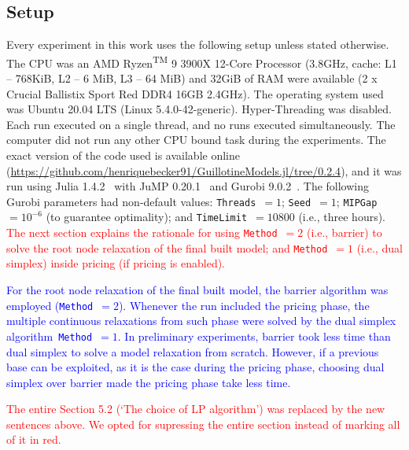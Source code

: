 \documentclass[smallextended]{svjour3}       %
\newif\iffinalversion
\newcommand{\newtext}[1]{\iffinalversion%
#1%
\else%
\textcolor{blue}{#1}%
\fi%
}
\newcommand{\oldtext}[1]{\iffinalversion%
#1%
\else%
\textcolor{red}{#1}%
\fi%
}
\begin{document}
\subsection{Setup}
\label{sec:setup}

Every experiment in this work uses the following setup unless stated otherwise.
The CPU was an AMD\textsuperscript{\textregistered} Ryzen\textsuperscript{TM} 9 3900X 12-Core Processor (3.8GHz, cache: L1 -- 768KiB, L2 -- 6 MiB, L3 -- 64 MiB) and 32GiB of RAM were available (2 x Crucial Ballistix Sport Red DDR4 16GB 2.4GHz).
The operating system used was Ubuntu 20.04 LTS (Linux 5.4.0-42-generic).
Hyper-Threading was disabled.
Each run executed on a single thread, and no runs executed simultaneously.
The computer did not run any other CPU bound task during the experiments.
The exact version of the code used is available online (\url{https://github.com/henriquebecker91/GuillotineModels.jl/tree/0.2.4}), and it was run using Julia 1.4.2~\cite{julia} with JuMP 0.20.1~\cite{JuMP} and Gurobi 9.0.2~\cite{gurobi}.
The following Gurobi parameters had non-default values: \texttt{Threads}~\(= 1\); \texttt{Seed}~\(= 1\); \texttt{MIPGap}~\(= 10^{-6}\) (to guarantee optimality); and \texttt{TimeLimit}~\(= 10800\) (i.e., three hours).
\oldtext{The next section explains the rationale for using \texttt{Method}~\(= 2\) (i.e., barrier) to solve the root node relaxation of the final built model; and \texttt{Method}~\(= 1\) (i.e., dual simplex) inside pricing (if pricing is enabled).}
\newtext{For the root node relaxation of the final built model, the barrier algorithm was employed (\texttt{Method}~\(= 2\)). Whenever the run included the pricing phase, the multiple continuous relaxations from such phase were solved by the dual simplex algorithm~\texttt{Method}~\(= 1\). In preliminary experiments, barrier took less time than dual simplex to solve a model relaxation from scratch. However, if a previous base can be exploited, as it is the case during the pricing phase, choosing dual simplex over barrier made the pricing phase take less time.}

\oldtext{The entire Section 5.2 (`The choice of LP algorithm') was replaced by the new sentences above. We opted for supressing the entire section instead of marking all of it in red.}
\end{document}
